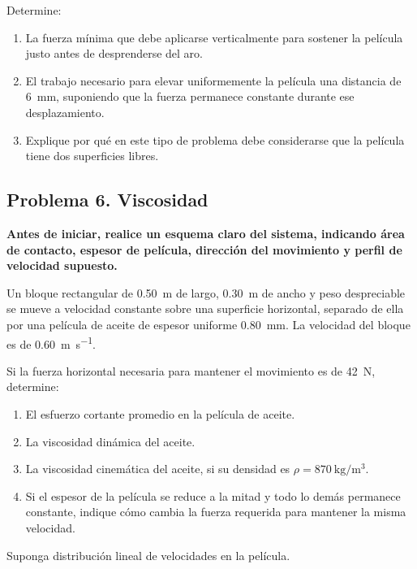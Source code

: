 \documentclass[11pt]{article}
\begin{document}
Determine:
\begin{enumerate}
\item La fuerza mínima que debe aplicarse verticalmente para sostener la película justo antes de desprenderse del aro.
\item El trabajo necesario para elevar uniformemente la película una distancia de \SI{6}{\milli\meter}, suponiendo que la fuerza permanece constante durante ese desplazamiento.
\item Explique por qué en este tipo de problema debe considerarse que la película tiene dos superficies libres.
\end{enumerate}

\subsection*{Problema 6. Viscosidad}
\textbf{Antes de iniciar, realice un esquema claro del sistema, indicando área de contacto, espesor de película, dirección del movimiento y perfil de velocidad supuesto.}

Un bloque rectangular de \SI{0.50}{\meter} de largo, \SI{0.30}{\meter} de ancho y peso despreciable se mueve a velocidad constante sobre una superficie horizontal, separado de ella por una película de aceite de espesor uniforme \SI{0.80}{\milli\meter}. La velocidad del bloque es de \SI{0.60}{\meter\per\second}.

Si la fuerza horizontal necesaria para mantener el movimiento es de \SI{42}{\newton}, determine:
\begin{enumerate}
\item El esfuerzo cortante promedio en la película de aceite.
\item La viscosidad dinámica del aceite.
\item La viscosidad cinemática del aceite, si su densidad es $\rho = \SI{870}{\kilogram\per\meter\cubed}$.
\item Si el espesor de la película se reduce a la mitad y todo lo demás permanece constante, indique cómo cambia la fuerza requerida para mantener la misma velocidad.
\end{enumerate}

Suponga distribución lineal de velocidades en la película.
\end{document}
